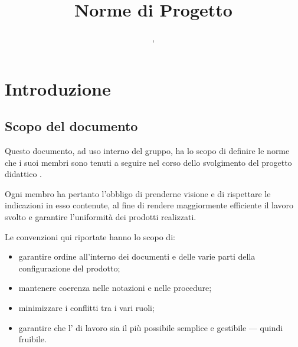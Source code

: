 


\author{\GG, \MM}
\supervisor{\LB, \AZ}
\dest{\ALL}
\title{Norme di Progetto}


\maketitle

\tableofcontents






\section{Introduzione}

\subsection{Scopo del documento}
Questo documento, ad uso interno del gruppo, ha lo scopo di definire le norme che i suoi membri sono tenuti a seguire nel corso dello svolgimento del progetto didattico \proj.

Ogni membro ha pertanto l'obbligo di prenderne visione e di rispettare le indicazioni in esso contenute, al fine di rendere maggiormente efficiente il lavoro svolto e garantire l'uniformità dei prodotti realizzati.

Le convenzioni qui riportate hanno lo scopo di:
\begin{itemize}
	\item garantire ordine all'interno dei documenti e delle varie parti della configurazione del prodotto;
	\item mantenere coerenza nelle notazioni e nelle procedure;
	\item minimizzare i conflitti tra i vari ruoli;
	\item garantire che l' di lavoro sia il più possibile semplice e gestibile --- quindi fruibile.
\end{itemize}

